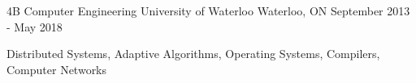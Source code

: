 

\begin{cventries}

  \cventry
    {4B Computer Engineering} %
    {University of Waterloo} %
    {Waterloo, ON} %
    {September 2013 - May 2018} %
    {
      \begin{cvitems} %
      \item {Distributed Systems, Adaptive Algorithms, Operating Systems, Compilers, Computer Networks}
      \end{cvitems}
    }

\end{cventries}
